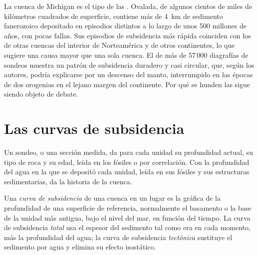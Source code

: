 La cuenca de Michigan es el tipo de las . Ovalada, de algunos cientos de miles
de kilómetros cuadrados de superficie, contiene más de \qty{4}{km} de sedimento fanerozoico depositado
en episodios distintos a lo largo de unos 500 millones de años, con pocas fallas. Sus episodios de subsidencia
más rápida coinciden con los de otras cuencas del interior de Norteamérica y de otros
continentes, lo que sugiere una causa mayor que una sola cuenca. El  de más de 57\,000
diagrafías de sondeos muestra un patrón de subsidencia duradero y casi circular, que, según los autores, podría explicarse
por un descenso del manto, interrumpido en las épocas de dos orogenias en el lejano
margen del continente. Por qué se hunden las  sigue siendo objeto de debate.

\section{Las curvas de subsidencia}\label{sec:b2:basins-compared:curves}

Un sondeo, o una sección medida, da para cada unidad su profundidad actual, su tipo de roca y su edad,
leída en los fósiles o por correlación. Con la profundidad del agua en la que se depositó cada unidad,
leída en sus fósiles y sus estructuras sedimentarias, da la historia de la cuenca.

\begin{definition}\label{def:b2:basins-compared:curve}
Una \emph{curva de subsidencia} de una cuenca en un lugar es la gráfica de la profundidad
de una superficie de referencia, normalmente el basamento o la base de la unidad más antigua, bajo el nivel del mar,
en función del tiempo. La curva de subsidencia \emph{total} usa el espesor del sedimento tal como era en cada
momento, más la profundidad del agua; la curva de subsidencia \emph{tectónica} sustituye el sedimento por agua
y elimina su efecto isostático.
\end{definition}

